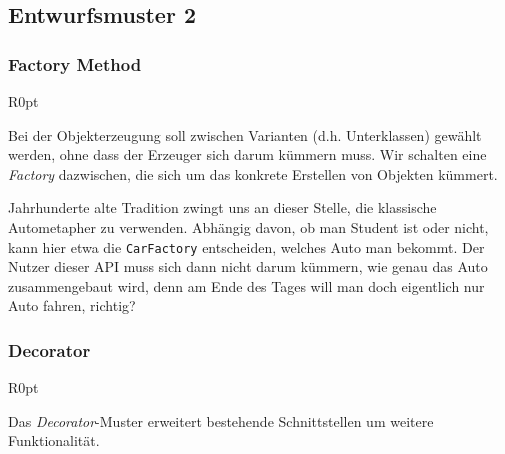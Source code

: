 \documentclass{panikzettel}
\begin{document}
\subsection{Entwurfsmuster 2} %

\subsubsection{Factory Method}

\begin{wrapfigure}[15]{R}{0pt}
\end{wrapfigure}

Bei der Objekterzeugung soll zwischen Varianten (d.h. Unterklassen) gewählt werden, ohne dass der Erzeuger sich darum kümmern muss. Wir schalten eine \emph{Factory} dazwischen, die sich um das konkrete Erstellen von Objekten kümmert.

Jahrhunderte alte Tradition zwingt uns an dieser Stelle, die klassische Autometapher zu verwenden. Abhängig davon, ob man Student ist oder nicht, kann hier etwa die \lstinline{CarFactory} entscheiden, welches Auto man bekommt. Der Nutzer dieser API muss sich dann nicht darum kümmern, wie genau das Auto zusammengebaut wird, denn am Ende des Tages will man doch eigentlich nur Auto fahren, richtig?

\subsubsection{Decorator}

\begin{wrapfigure}[11]{R}{0pt}
\end{wrapfigure}

Das \emph{Decorator}-Muster erweitert bestehende Schnittstellen um weitere Funktionalität.
\end{document}
